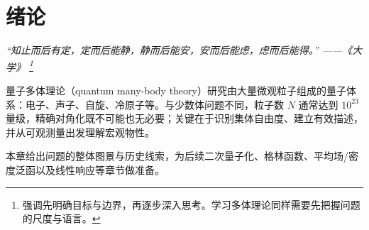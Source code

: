 \chapter{绪论}
\renewcommand{\currentchapterpath}{chapters/ch01/}

\begin{flushright}
\textit{“知止而后有定，定而后能静，静而后能安，安而后能虑，虑而后能得。” ——《大学》
\footnote{强调先明确目标与边界，再逐步深入思考。学习多体理论同样需要先把握问题的尺度与语言。}}
\end{flushright}

量子多体理论（quantum many-body theory）研究由大量微观粒子组成的量子体系：电子、声子、自旋、冷原子等。与少数体问题不同，粒子数 $N$ 通常达到 $10^{23}$ 量级，精确对角化既不可能也无必要；关键在于识别集体自由度、建立有效描述，并从可观测量出发理解宏观物性。

本章给出问题的整体图景与历史线索，为后续二次量子化、格林函数、平均场/密度泛函以及线性响应等章节做准备。



